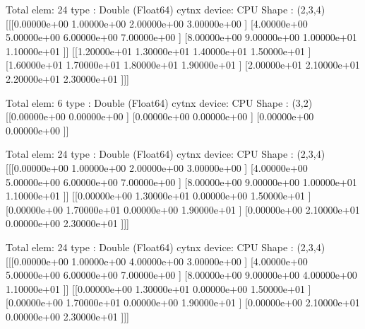 \documentclass[letterpaper,10pt,english]{sphinxmanual}
\begin{document}
\begin{sphinxVerbatim}[commandchars=\\\{\}]
Total elem: 24
type  : Double (Float64)
cytnx device: CPU
Shape : (2,3,4)
[[[0.00000e+00 1.00000e+00 2.00000e+00 3.00000e+00 ]
  [4.00000e+00 5.00000e+00 6.00000e+00 7.00000e+00 ]
  [8.00000e+00 9.00000e+00 1.00000e+01 1.10000e+01 ]]
 [[1.20000e+01 1.30000e+01 1.40000e+01 1.50000e+01 ]
  [1.60000e+01 1.70000e+01 1.80000e+01 1.90000e+01 ]
  [2.00000e+01 2.10000e+01 2.20000e+01 2.30000e+01 ]]]


Total elem: 6
type  : Double (Float64)
cytnx device: CPU
Shape : (3,2)
[[0.00000e+00 0.00000e+00 ]
 [0.00000e+00 0.00000e+00 ]
 [0.00000e+00 0.00000e+00 ]]


Total elem: 24
type  : Double (Float64)
cytnx device: CPU
Shape : (2,3,4)
[[[0.00000e+00 1.00000e+00 2.00000e+00 3.00000e+00 ]
  [4.00000e+00 5.00000e+00 6.00000e+00 7.00000e+00 ]
  [8.00000e+00 9.00000e+00 1.00000e+01 1.10000e+01 ]]
 [[0.00000e+00 1.30000e+01 0.00000e+00 1.50000e+01 ]
  [0.00000e+00 1.70000e+01 0.00000e+00 1.90000e+01 ]
  [0.00000e+00 2.10000e+01 0.00000e+00 2.30000e+01 ]]]


Total elem: 24
type  : Double (Float64)
cytnx device: CPU
Shape : (2,3,4)
[[[0.00000e+00 1.00000e+00 4.00000e+00 3.00000e+00 ]
  [4.00000e+00 5.00000e+00 6.00000e+00 7.00000e+00 ]
  [8.00000e+00 9.00000e+00 4.00000e+00 1.10000e+01 ]]
 [[0.00000e+00 1.30000e+01 0.00000e+00 1.50000e+01 ]
  [0.00000e+00 1.70000e+01 0.00000e+00 1.90000e+01 ]
  [0.00000e+00 2.10000e+01 0.00000e+00 2.30000e+01 ]]]
\end{sphinxVerbatim}
\end{document}
